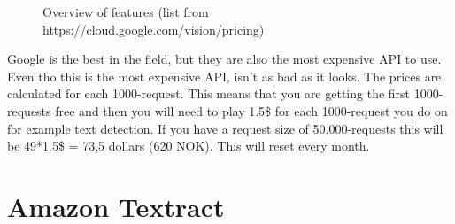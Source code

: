 \begin{figure}[h]
    \caption{Overview of features (list from https://cloud.google.com/vision/pricing)}
    \label{fig:Prices}
\end{figure}

Google is the best in the field, but they are also the most expensive API to use.
Even tho this is the most expensive API, isn't as bad as it looks.
The prices are calculated for each 1000-request.
This means that you are getting the first 1000-requests free and then you will need to play 1.5\$ for each 1000-request you do on for example text detection.
If you have a request size of 50.000-requests this will be 49*1.5\$ = 73,5 dollars (620 NOK).
This will reset every month.


\section{Amazon Textract}\label{sec:API_Amazon}

